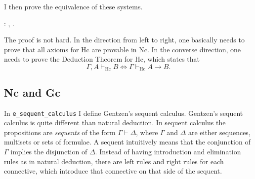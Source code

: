 \documentclass{article}
\DeclareMathOperator{\Hc}{Hc}
\newenvironment{code}%
 {\small\begin{list}{}%
         {\setlength{\leftmargin}{10mm}}%
         \item[]%
 }
 {\end{list}}
\begin{document}
I then prove the equivalence of these systems.
\begin{code}
\coqdocnoindent
{}  : \coqdockw{\ensuremath{\forall}}  ,       .\coqdoceol
\end{code}
The proof is not hard. In the direction from left to right, one basically needs to prove that all axioms for Hc are provable in Nc. In the converse direction, one needs to prove the Deduction Theorem for Hc, which states that
$$\Gamma,A\vdash_{\Hc} B\iff\Gamma\vdash_{\Hc} A\to B.$$
\subsection{Nc and Gc}\label{sec_equiv_Gc}
In \verb"e_sequent_calculus" I define Gentzen's sequent calculus. Gentzen's sequent calculus is quite different than natural deduction. In sequent calculus the propositions are \emph{sequents} of the form $\Gamma\vdash\Delta$, where $\Gamma$ and $\Delta$ are either sequences, multisets or sets of formulae. A sequent intuitively means that the conjunction of $\Gamma$ implies the disjunction of $\Delta$. Instead of having introduction and elimination rules as in natural deduction, there are left rules and right rules for each connective, which introduce that connective on that side of the sequent.
\end{document}
